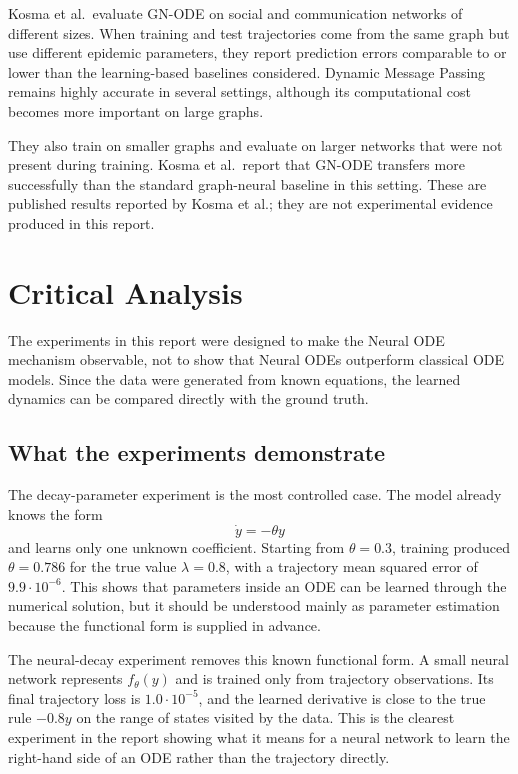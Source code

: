\documentclass[11pt,a4paper]{article}
\begin{document}
Kosma et al.\ evaluate GN-ODE on social and communication networks of
different sizes. When training and test trajectories come from the same graph
but use different epidemic parameters, they report prediction errors comparable
to or lower than the learning-based baselines considered. Dynamic Message
Passing remains highly accurate in several settings, although its computational
cost becomes more important on large graphs.

They also train on smaller graphs and evaluate on larger networks that were not
present during training. Kosma et al.\ report that GN-ODE transfers more
successfully than the standard graph-neural baseline in this setting. These are
published results reported by Kosma et al.; they are not experimental evidence
produced in this report.

\section{Critical Analysis}
\label{sec:critical}

The experiments in this report were designed to make the Neural ODE mechanism
observable, not to show that Neural ODEs outperform classical ODE models. Since
the data were generated from known equations, the learned dynamics can be
compared directly with the ground truth.

\subsection{What the experiments demonstrate}

The decay-parameter experiment is the most controlled case. The model already
knows the form
\[
    \dot y=-\theta y
\]
and learns only one unknown coefficient. Starting from $\theta=0.3$, training
produced $\theta=0.786$ for the true value $\lambda=0.8$, with a trajectory
mean squared error of $9.9\cdot10^{-6}$. This shows that parameters inside an
ODE can be learned through the numerical solution, but it should be understood
mainly as parameter estimation because the functional form is supplied in
advance.

The neural-decay experiment removes this known functional form. A small neural
network represents $f_\theta(y)$ and is trained only from trajectory
observations. Its final trajectory loss is $1.0\cdot10^{-5}$, and the learned
derivative is close to the true rule $-0.8y$ on the range of states visited by
the data. This is the clearest experiment in the report showing what it means
for a neural network to learn the right-hand side of an ODE rather than the
trajectory directly.
\end{document}
